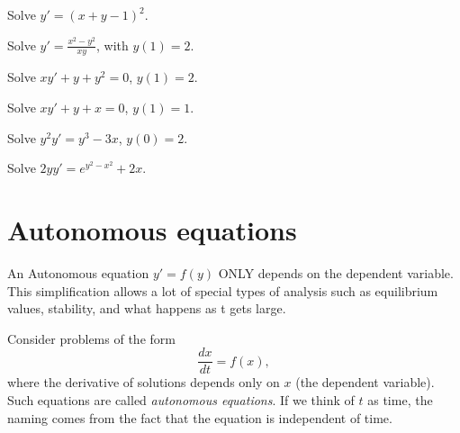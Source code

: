 \begin{exercise}
Solve $y' = {(x+y-1)}^2$.
\end{exercise}

\begin{exercise}
Solve $y' = \frac{x^2-y^2}{x y}$, with $y(1) = 2$.
\end{exercise}



\begin{exercise}
Solve $xy'+y+y^2 = 0$, $y(1)=2$.
\end{exercise}

\begin{exercise}
Solve $xy'+y +x = 0$, $y(1)=1$.
\end{exercise}

\begin{exercise}
Solve $y^2y' = y^3-3x$, $y(0)=2$.
\end{exercise}

\begin{exercise}
Solve $2yy' = e^{y^2-x^2} + 2x$.
\end{exercise}


\sectionnewpage
\section{Autonomous equations}
\label{auteq:section}

\begin{video}
    An Autonomous equation $y'=f(y)$ ONLY depends on the dependent variable. This simplification allows a lot of special types of analysis such as equilibrium values, stability, and what happens as t gets large. 
\end{video}

Consider
problems of the form
\begin{equation*}
\frac{dx}{dt} = f(x) ,
\end{equation*}
where the derivative of solutions depends only on $x$ (the dependent
variable).  Such equations are called \emph{autonomous
equations}.  If we think
of $t$ as time, the naming comes from the fact that the equation is
independent of time.

